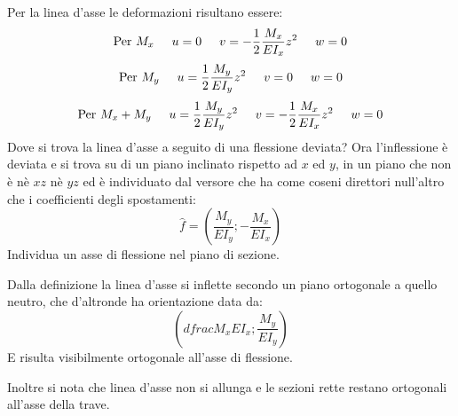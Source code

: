 \documentclass{article}
\begin{document}
\begin{adjustwidth}{2in}{}
		Per la linea d'asse le deformazioni risultano essere: 
		\[ \text{Per} ~ M_x \hspace{0.5cm} u = 0 \hspace{0.5cm} v = -\dfrac{1}{2}\dfrac{M_x}{EI_x}z^2 \hspace{0.5cm} w = 0\]
		\[ \text{Per} ~ M_y \hspace{0.5cm} u = \dfrac{1}{2}\dfrac{M_y}{EI_y}z^2 \hspace{0.5cm} v = 0 \hspace{0.5cm} w = 0\]
		\[ \text{Per} ~ M_x +M_y \hspace{0.5cm} u = \dfrac{1}{2}\dfrac{M_y}{EI_y}z^2 \hspace{0.5cm} v = -\dfrac{1}{2}\dfrac{M_x}{EI_x}z^2 \hspace{0.5cm} w = 0\]
		Dove si trova la linea d'asse a seguito di una flessione deviata? Ora l'inflessione è deviata e si trova su di un piano inclinato rispetto ad $x$ ed $y$, in un piano che non è nè $xz$ nè $yz$ ed è individuato dal versore che ha come coseni direttori null'altro che i coefficienti degli spostamenti:
		\[\hat{f} = \left(\dfrac{M_y}{EI_y}; -\dfrac{M_x}{EI_x}\right)\]
		Individua un asse di flessione nel piano di sezione.
		
		Dalla definizione la linea d'asse si inflette secondo un piano ortogonale a quello neutro, che d'altronde ha orientazione data da:
		\[\left( dfrac{M_x}{EI_x};\dfrac{M_y}{EI_y}\right)\]
		E risulta visibilmente ortogonale all'asse di flessione. 
		
		Inoltre si nota che linea d'asse non si allunga e le sezioni rette restano ortogonali all'asse della trave. \newline 
		

\end{adjustwidth}
\end{document}
